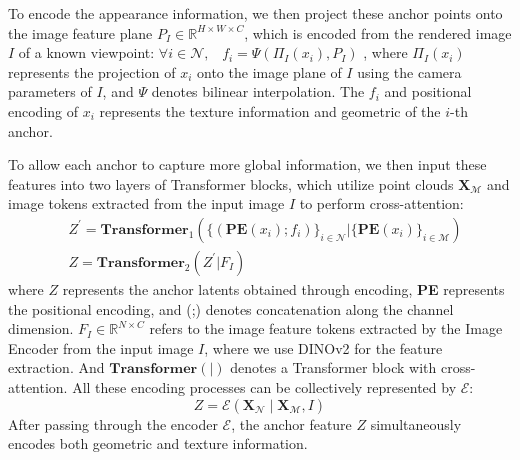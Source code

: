 To encode the appearance information, we then project these anchor points onto the image feature plane $P_I \in \mathbb{R}^{H\times W \times C}$, which is encoded from the rendered image \(I\) of a known viewpoint:
$
    \forall i \in \mathcal{N},\; \; \;  f_{i}=\Psi( \Pi_I(x_i), P_I)
$
, where \( \Pi_I(x_i) \) represents the projection of \( x_i\) onto the image plane of \( I\) using the camera parameters of \( I\), and \( \Psi \) denotes bilinear interpolation. 
%
%
The \( f_i \) and positional encoding of \( x_i \)  represents the  texture information and geometric of the \( i \)-th anchor. 

To allow each anchor to capture more global information, we then input these features into two layers of Transformer blocks, which utilize point clouds $\mathbf{X}_\mathcal{M}$ and image tokens extracted from the input image \( I \) to perform cross-attention:
\begin{equation}
\begin{aligned}
   & Z^{'} = \mathbf{Transformer}_1(\{(\mathbf{PE}(x_i);f_i) \}_{i \in \mathcal{N}}| \{\mathbf{PE}(x_i)\}_{i \in \mathcal{M}}) \\
& Z = \mathbf{Transformer}_2(Z^{'}| F_I) 
\end{aligned}
\label{eq: enc}
\end{equation}
where $Z$ represents the anchor latents obtained through encoding, \textbf{PE} represents the positional encoding, and (;) denotes concatenation along the channel dimension. $F_I \in \mathbb{R}^{N\times C}$ refers to the image feature tokens extracted by the Image Encoder from the input image $I$, where we use DINOv2\cite{oquab2023dinov2} for the feature extraction.
And $\mathbf{Transformer}(|)$ denotes a Transformer block with cross-attention.
All these encoding processes can be collectively represented by $\mathcal{E}$:
\begin{equation}
    Z = \mathcal{E}(\mathbf{X}_\mathcal{N} \mid \mathbf{X}_\mathcal{M} , I)
\end{equation}
After passing through the encoder $\mathcal{E}$, the anchor feature 
$ Z$ simultaneously encodes both geometric and texture information.
\label{sec:enc}

